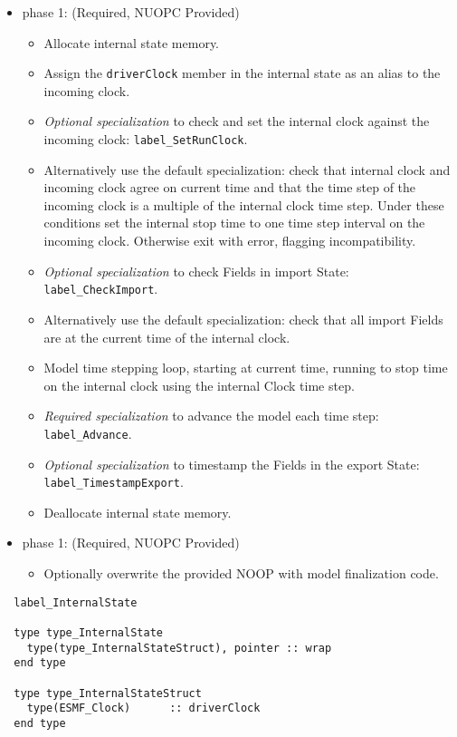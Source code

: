\begin{itemize}
\item phase 1: ({\sc Required, NUOPC Provided})
  \begin{itemize}
  \item Allocate internal state memory.
  \item Assign the {\tt driverClock} member in the internal state as an alias to the incoming clock.
  \item {\it Optional specialization} to check and set the internal clock against the incoming clock: {\tt label\_SetRunClock}.
  \item Alternatively use the default specialization: check that internal clock and incoming clock agree on current time and that the time step of the incoming clock is a multiple of the internal clock time step. Under these conditions set the internal stop time to one time step interval on the incoming clock. Otherwise exit with error, flagging incompatibility.
  \item {\it Optional specialization} to check Fields in import State: {\tt label\_CheckImport}.
  \item Alternatively use the default specialization: check that all import Fields are at the current time of the internal clock.
  \item Model time stepping loop, starting at current time, running to stop time on the internal clock using the internal Clock time step.
  \item {\it Required specialization} to advance the model each time step: {\tt label\_Advance}.
  \item {\it Optional specialization} to timestamp the Fields in the export State: {\tt label\_TimestampExport}.
  \item Deallocate internal state memory.
  \end{itemize}    
\end{itemize}

\begin{itemize}
\item phase 1: ({\sc Required, NUOPC Provided})
  \begin{itemize}
  \item Optionally overwrite the provided NOOP with model finalization code.
  \end{itemize}      
\end{itemize}

\begin{verbatim}  label_InternalState

  type type_InternalState
    type(type_InternalStateStruct), pointer :: wrap
  end type

  type type_InternalStateStruct
    type(ESMF_Clock)      :: driverClock
  end type

\end{verbatim}

